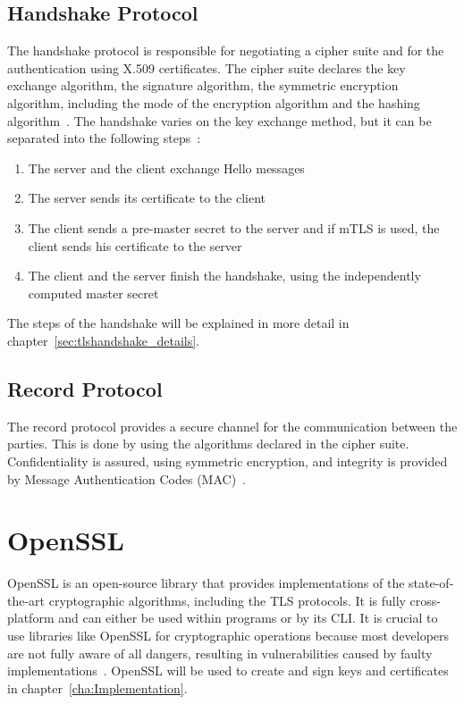 \subsection{Handshake Protocol}
The handshake protocol is responsible for negotiating a cipher suite and for the authentication using X.509 certificates.
The cipher suite declares the key exchange algorithm, the signature algorithm, the symmetric encryption algorithm, including the mode of the encryption algorithm and the hashing algorithm~\cite{turnertls, kurbatov2021design}.
The handshake varies on the key exchange method, but it can be separated into the following steps~\cite{krawczyk2013security}:
\begin{enumerate}
    \item The server and the client exchange Hello messages
    \item The server sends its certificate to the client
    \item The client sends a pre-master secret to the server and if mTLS is used, the client sends his certificate to the server
    \item The client and the server finish the handshake, using the independently computed master secret
\end{enumerate}
The steps of the handshake will be explained in more detail in chapter~\ref{sec:tlshandshake_details}.


\subsection{Record Protocol}
The record protocol provides a secure channel for the communication between the parties.
This is done by using the algorithms declared in the cipher suite.
Confidentiality is assured, using symmetric encryption, and integrity is provided by Message Authentication Codes (MAC)~\cite{kurbatov2021design, krawczyk2013security}.

\section{OpenSSL}
OpenSSL is an open-source library that provides implementations of the state-of-the-art cryptographic algorithms, including the TLS protocols.
It is fully cross-platform and can either be used within programs or by its CLI.
It is crucial to use libraries like OpenSSL for cryptographic operations because most developers are not fully aware of all dangers, resulting in vulnerabilities caused by faulty implementations~\cite{viega2002network}.
OpenSSL will be used to create and sign keys and certificates in chapter~\ref{cha:Implementation}.

